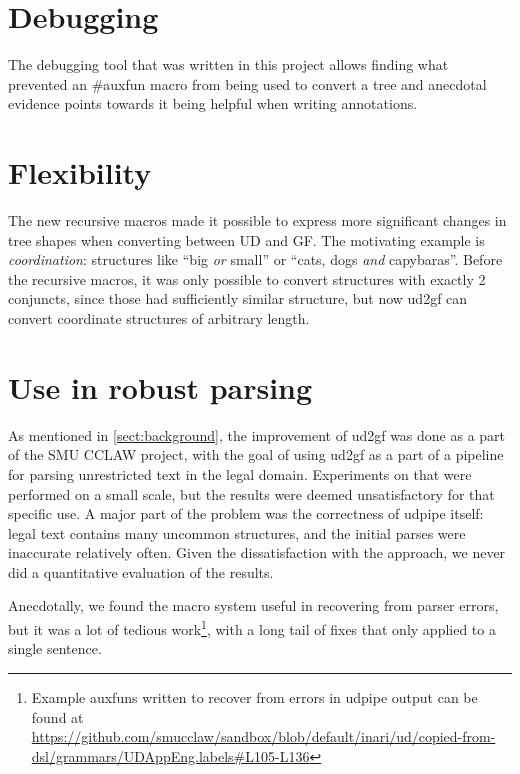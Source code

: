 \section{Debugging}

The debugging tool that was written in this project allows finding what prevented an \#auxfun macro from being used to convert a tree and anecdotal evidence points towards it being helpful when writing annotations.


\section{Flexibility}


The new recursive macros made it possible to express more significant changes in tree shapes when converting between UD and GF. The motivating example is \emph{coordination}: structures like ``big \emph{or} small'' or ``cats, dogs \emph{and} capybaras''. Before the recursive macros, it was only possible to convert structures with exactly 2 conjuncts, since those had sufficiently similar structure, but now ud2gf can convert coordinate structures of arbitrary length.


\section{Use in robust parsing}

As mentioned in \autoref{sect:background}, the improvement of ud2gf was done as a part of the SMU CCLAW project, with the goal of using ud2gf as a part of a pipeline for parsing unrestricted text in the legal domain.
Experiments on that were performed on a small scale, but the results were deemed unsatisfactory for that specific use. A major part of the problem was the correctness of udpipe itself: legal text contains many uncommon structures, and the initial parses were inaccurate relatively often.
Given the dissatisfaction with the approach, we never did a quantitative evaluation of the results.

Anecdotally, we found the macro system useful in recovering from parser errors, but it was a lot of tedious work\footnote{Example auxfuns written to recover from errors in udpipe output can be found at \url{https://github.com/smucclaw/sandbox/blob/default/inari/ud/copied-from-dsl/grammars/UDAppEng.labels\#L105-L136}}, with a long tail of fixes that only applied to a single sentence.



%

